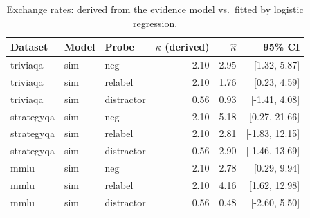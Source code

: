 \begin{table}[t]
\centering
\small
\begin{tabular}{lllrrr}
\toprule
Dataset & Model & Probe & $\kappa$ (derived) & $\hat\kappa$ & 95\% CI \\
\midrule
triviaqa & sim & neg & 2.10 & 2.95 & [1.32, 5.87] \\
triviaqa & sim & relabel & 2.10 & 1.76 & [0.23, 4.59] \\
triviaqa & sim & distractor & 0.56 & 0.93 & [-1.41, 4.08] \\
strategyqa & sim & neg & 2.10 & 5.18 & [0.27, 21.66] \\
strategyqa & sim & relabel & 2.10 & 2.81 & [-1.83, 12.15] \\
strategyqa & sim & distractor & 0.56 & 2.90 & [-1.46, 13.69] \\
mmlu & sim & neg & 2.10 & 2.78 & [0.29, 9.94] \\
mmlu & sim & relabel & 2.10 & 4.16 & [1.62, 12.98] \\
mmlu & sim & distractor & 0.56 & 0.48 & [-2.60, 5.50] \\
\bottomrule
\end{tabular}
\caption{Exchange rates: derived from the evidence model vs.\ fitted by logistic regression.}
\label{tab:kappa}
\end{table}
